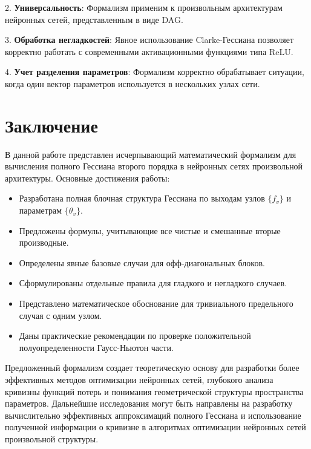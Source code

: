 \documentclass[11pt]{article}
\begin{document}
2. \textbf{Универсальность}: Формализм применим к произвольным архитектурам нейронных сетей, представленным в виде DAG.

3. \textbf{Обработка негладкостей}: Явное использование Clarke-Гессиана позволяет корректно работать с
современными активационными функциями типа ReLU.

4. \textbf{Учет разделения параметров}: Формализм корректно обрабатывает ситуации, когда один вектор
параметров используется в нескольких узлах сети.

\section{Заключение}

В данной работе представлен исчерпывающий математический формализм для вычисления полного Гессиана второго
порядка в нейронных сетях произвольной архитектуры. Основные достижения работы:

\begin{itemize}
  \item Разработана полная блочная структура Гессиана по выходам узлов $\{f_v\}$ и параметрам $\{\theta_v\}$.
  \item Предложены формулы, учитывающие все чистые и смешанные вторые производные.
  \item Определены явные базовые случаи для офф-диагональных блоков.
  \item Сформулированы отдельные правила для гладкого и негладкого случаев.
  \item Представлено математическое обоснование для тривиального предельного случая с одним узлом.
  \item Даны практические рекомендации по проверке положительной полуопределенности Гаусс-Ньютон части.
\end{itemize}

Предложенный формализм создает теоретическую основу для разработки более эффективных методов оптимизации
нейронных сетей, глубокого анализа кривизны функций потерь и понимания геометрической структуры пространства
параметров. Дальнейшие исследования могут быть направлены на разработку вычислительно эффективных
аппроксимаций полного Гессиана и использование полученной информации о кривизне в алгоритмах оптимизации
нейронных сетей произвольной структуры.
\end{document}
